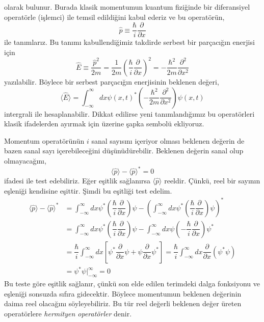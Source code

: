 \documentclass[a4paper,12pt, twoside]{article}
\begin{document}
olarak bulunur. Burada klasik momentumun kuantum fiziğinde bir diferansiyel operatörle (işlemci) ile temsil edildiğini kabul ederiz ve bu operatörün,
\begin{equation}
\hat p \equiv \dfrac {\hbar }{i}\dfrac {\partial}{\partial x}
\end{equation}
ile tanımlarız. Bu tanımı kabullendiğimiz takdirde serbest bir parçacığın enerjisi için
\begin{equation}
\hat E \equiv \dfrac{\hat p^2}{2 m} = \dfrac {1 }{2 m}\left(\dfrac {\hbar }{i}\dfrac {\partial}{\partial x}\right)^2 = -\dfrac {\hbar^2 }{2 m}\dfrac {\partial^2}{\partial x^2}
\end{equation}
yazılabilir. Böylece bir serbest parçacığın enerjisinin beklenen değeri,
\begin{equation}
\langle \hat E\rangle =  \int ^{\infty }_{-\infty }dx \psi(x,t) ^{\ast }\left(-\dfrac {\hbar^2 }{2 m}\dfrac {\partial^2}{\partial x^2}\right) \psi(x,t)
\label{eq:expactation_value_and_op_energy}
\end{equation}
intergrali ile hesaplanabilir. Dikkat edilirse yeni tanımlandığımız bu operatörleri klasik ifadelerden ayırmak için üzerine şapka sembolü ekliyoruz.

Momentum operatörünün $i$ sanal sayısını içeriyor olması beklenen değerin de bazen sanal sayı içerebileceğini düşünüdürebilir. Beklenen değerin sanal olup olmayacağını,
\begin{equation}
\langle \hat p \rangle - \langle \hat p \rangle^\ast = 0
\end{equation}
ifadesi ile test edebiliriz. Eğer eşitlik sağlanırsa $\langle \hat p \rangle$ reeldir. Çünkü, reel bir sayının eşleniği kendisine eşittir. Şimdi bu eşitliği test edelim.
\begin{align*}
\langle \hat p \rangle - \langle \hat p \rangle^\ast &= \int ^{\infty }_{-\infty }dx \psi ^{\ast }\left(\dfrac {\hbar }{i}\dfrac {\partial}{\partial x}\right) \psi - \left(  \int ^{\infty }_{-\infty }dx \psi ^{\ast }\left(\dfrac {\hbar }{i}\dfrac {\partial}{\partial x}\right) \psi  \right)^\ast \\
&= \int ^{\infty }_{-\infty }dx \psi ^{\ast }\left(\dfrac {\hbar }{i}\dfrac {\partial}{\partial x}\right) \psi -   \int ^{\infty }_{-\infty }dx \psi \left(-\dfrac {\hbar }{i}\dfrac {\partial}{\partial x}\right) \psi^\ast \\
&= \dfrac {\hbar }{i} \int ^{\infty }_{-\infty }dx \left[\psi ^{\ast } \dfrac {\partial}{\partial x} \psi +  \psi \dfrac {\partial}{\partial x}\psi^\ast\right] = \dfrac {\hbar }{i} \int ^{\infty }_{-\infty }dx \dfrac {\partial}{\partial x}\left( \psi ^{\ast } \psi\right)\\
&=\psi^\ast \psi {\bigg |}^{\infty}_{-\infty} = 0
\end{align*}
Bu teste göre eşitlik sağlanır, çünkü son elde edilen terimdeki dalga fonksiyonu ve eşleniği sonsuzda sıfıra gidecektir. Böylece momentumun beklenen değerinin daima reel olacağını söyleyebiliriz. Bu tür reel değerli beklenen değer üreten operatörlere \emph{hermityen operatörler} denir.
\end{document}
